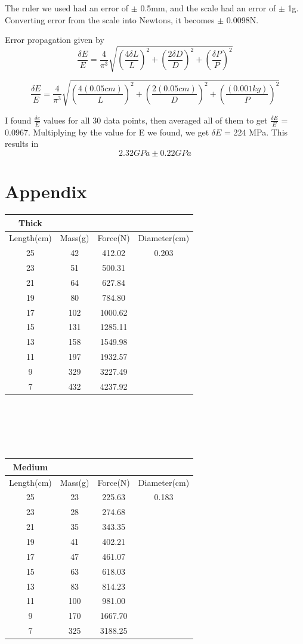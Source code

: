 \documentclass[12pt]{article}
\begin{document}
The ruler we used had an error of $\pm$ 0.5mm, and the scale had an error of $\pm$ 1g. Converting error from the scale into Newtons, it becomes $\pm$ 0.0098N.

Error propagation given by
$$\frac{\delta E}{E} = \frac{4}{\pi ^3}\sqrt{(\frac{4\delta L}{L})^2 + (\frac{2\delta D}{D})^2 + (\frac{\delta P}{P})^2}$$

$$\frac{\delta E}{E} = \frac{4}{\pi ^3}\sqrt{(\frac{4(0.05cm)}{L})^2 + (\frac{2(0.05cm)}{D})^2 + (\frac{(0.001kg)}{P})^2}$$

I found $\frac{\delta e}{E}$ values for all 30 data points, then averaged all of them to get $\frac{\delta E}{E}$ = 0.0967. Multiplying by the value for E we found, we get $\delta E$ = 224 MPa. This results in $$2.32GPa \pm 0.22GPa$$

\section{Appendix}
\centering
\begin{tabular}{|| c | c | c | c ||}
 \hline
 Thick &\ &\ &\ \\
 \hline
 Length(cm) & Mass(g) & Force(N) & Diameter(cm) \\
 \hline
 \hline
 25 & 42 & 412.02 & 0.203 \\
 23 & 51 & 500.31 &\ \\
 21 & 64 & 627.84 &\ \\
 19 & 80 & 784.80 &\ \\
 17 & 102 & 1000.62 &\ \\
 15 & 131 & 1285.11 &\ \\
 13 & 158 & 1549.98 &\ \\
 11 & 197 & 1932.57 &\ \\
 9 & 329 & 3227.49 &\ \\
 7 & 432 & 4237.92 &\ \\
 \hline
\end{tabular}\\\ \\\ \\\ 

\centering
\begin{tabular}{|| c | c | c | c ||}
 \hline
 Medium &\ &\ &\ \\
 \hline
 Length(cm) & Mass(g) & Force(N) & Diameter(cm) \\
 \hline
 \hline
 25 & 23 & 225.63 & 0.183\\
 23 & 28 & 274.68 &\ \\
 21 & 35 & 343.35 &\ \\
 19 & 41 & 402.21 &\ \\
 17 & 47 & 461.07 &\ \\
 15 & 63 & 618.03 &\ \\
 13 & 83 & 814.23 &\ \\
 11 & 100 & 981.00 &\ \\
 9 & 170 & 1667.70 &\ \\
 7 & 325 & 3188.25 &\ \\
 \hline
\end{tabular}\\\ \\\ \\\ 
\end{document}
